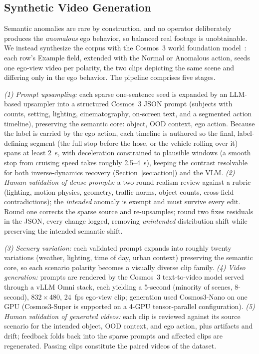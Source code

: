 \documentclass[conference]{IEEEtran}
\begin{document}
\subsection{Synthetic Video Generation}\label{sec:videogen}

Semantic anomalies are rare by construction, and no operator deliberately produces the \emph{anomalous} ego behavior, so balanced real footage is unobtainable. We instead synthesize the corpus with the Cosmos~3 world foundation model~\cite{b30}: each row's Example field, extended with the Normal or Anomalous action, seeds one ego-view video per polarity, the two clips depicting the same scene and differing only in the ego behavior. The pipeline comprises five stages.

\emph{(1) Prompt upsampling:} each sparse one-sentence seed is expanded by an LLM-based upsampler into a structured Cosmos~3 JSON prompt (subjects with counts, setting, lighting, cinematography, on-screen text, and a segmented action timeline), preserving the semantic core: object, OOD context, ego action. Because the label is carried by the ego action, each timeline is authored so the final, label-defining segment (the full stop before the hose, or the vehicle rolling over it) spans at least 2~s, with deceleration constrained to plausible windows (a smooth stop from cruising speed takes roughly 2.5--4~s), keeping the contrast resolvable for both inverse-dynamics recovery (Section~\ref{sec:action}) and the VLM. \emph{(2) Human validation of dense prompts:} a two-round realism review against a rubric (lighting, motion physics, geometry, traffic norms, object counts, cross-field contradictions); the \emph{intended} anomaly is exempt and must survive every edit. Round one corrects the sparse source and re-upsamples; round two fixes residuals in the JSON, every change logged, removing \emph{unintended} distribution shift while preserving the intended semantic shift.

\emph{(3) Scenery variation:} each validated prompt expands into roughly twenty variations (weather, lighting, time of day, urban context) preserving the semantic core, so each scenario polarity becomes a visually diverse clip family. \emph{(4) Video generation:} prompts are rendered by the Cosmos~3 text-to-video model served through a vLLM Omni stack, each yielding a 5-second (minority of scenes, 8-second), $832\times480$, 24~fps ego-view clip; generation used Cosmos3-Nano on one GPU (Cosmos3-Super is supported on a 4-GPU tensor-parallel configuration). \emph{(5) Human validation of generated videos:} each clip is reviewed against its source scenario for the intended object, OOD context, and ego action, plus artifacts and drift; feedback folds back into the sparse prompts and affected clips are regenerated. Passing clips constitute the paired videos of the dataset.
\end{document}
